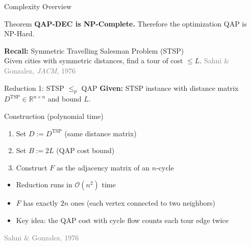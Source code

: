 \documentclass[aspectratio=169,11pt]{beamer}
\newcommand{\BigO}{\mathcal{O}}
\newcommand{\reference}[1]{\hfill{\scriptsize\textcolor{gray}{#1}}}
\begin{document}
\begin{frame}{Complexity Overview}
\begin{block}{Theorem}
\textbf{QAP-DEC is NP-Complete.}  Therefore the optimization QAP is \alert{NP-Hard}.
\end{block}
\vspace{6pt}
\centering
{}
\vspace{8pt}

\textbf{Recall:} Symmetric Travelling Salesman Problem (STSP)\\
  \vspace{20pt}
Given cities with symmetric distances, find a tour of cost $\le L$.
\reference{Sahni \& Gonzalez, \emph{JACM}, 1976}
\end{frame}

\begin{frame}{Reduction 1: STSP $\le_p$ QAP}
\textbf{Given:} STSP instance with distance matrix $D^{\text{TSP}}\in\mathbb{R}^{n\times n}$ and bound $L$.

\vspace{6pt}
\begin{block}{Construction (polynomial time)}
\begin{enumerate}
  \item Set $D := D^{\text{TSP}}$ \quad (same distance matrix)
  \item Set $B := 2L$ \quad (QAP cost bound)
  \item Construct $F$ as the \alert{adjacency matrix of an $n$-cycle}
\end{enumerate}
\end{block}
\vspace{4pt}
\begin{itemize}
  \item Reduction runs in $\BigO(n^2)$ time
  \item $F$ has exactly $2n$ ones (each vertex connected to two neighbors)
  \item Key idea: the QAP cost with cycle flow counts each tour edge \alert{twice}
\end{itemize}
\reference{Sahni \& Gonzalez, 1976}
\end{frame}
\end{document}
